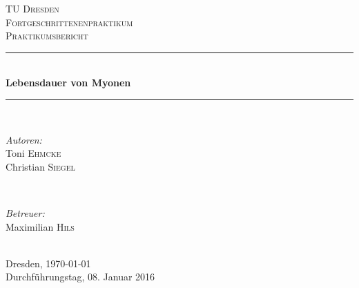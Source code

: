 \begin{titlepage}
\newcommand{\HRule}{\rule{\linewidth}{0.5mm}} %

\center %
 

\textsc{\LARGE TU Dresden}\\[1.5cm] %
\textsc{\Large Fortgeschrittenenpraktikum}\\[0.5cm] %
\textsc{\Large Praktikumsbericht}\\[0.5cm] %


\HRule \\[0.7cm]
{ \huge \bfseries Lebensdauer von Myonen}\\[0.4cm] %
\HRule \\[1.5cm]
 

\begin{minipage}{0.4\textwidth}
\begin{flushleft} \large
\emph{Autoren:}\\
Toni \textsc{Ehmcke}\\
Christian \textsc{Siegel}
\end{flushleft}
\end{minipage}
~
\begin{minipage}{0.4\textwidth}
\begin{flushright} \large
\emph{Betreuer:} \\
Maximilian \textsc{Hils} %
\end{flushright}
\end{minipage}\\[4cm]


{\large Dresden, \today}\\
\vspace{5mm}
{\large Durchführungstag, 08. Januar 2016}\\

\vfill 

\end{titlepage}